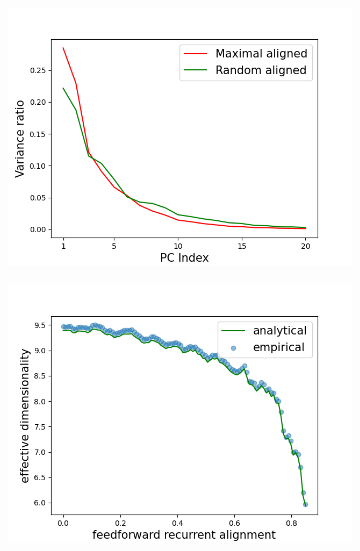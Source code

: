 \documentclass[11pt]{article}
\begin{document}
		\begin{figure}[H] 
			\centering
			\begin{subfigure}[b]{0.45\textwidth} 
				\includegraphics[width=\textwidth]{../figures/dim_align_rand_sym.png}
				\caption{}
			\end{subfigure}
			\begin{subfigure}[b]{0.45\textwidth}
				\includegraphics[width=\textwidth]{../figures/dim_sym.png}
				\caption{}
				\label{fig:dim_sym}
			\end{subfigure}
			\vspace{-0.2cm}

\end{figure}
\end{document}
